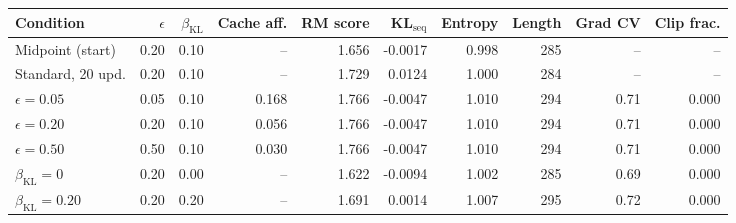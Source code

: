 \begin{tabular}{lrrrrrrrrr}
\toprule
Condition & $\epsilon$ & $\beta_\text{KL}$ & Cache aff. & RM score & KL$_\text{seq}$ & Entropy & Length & Grad CV & Clip frac. \\
\midrule
Midpoint (start) & 0.20 & 0.10 & -- & 1.656 & -0.0017 & 0.998 & 285 & -- & -- \\
Standard, 20 upd. & 0.20 & 0.10 & -- & 1.729 & 0.0124 & 1.000 & 284 & -- & -- \\
\midrule
$\epsilon{=}0.05$ & 0.05 & 0.10 & 0.168 & 1.766 & -0.0047 & 1.010 & 294 & 0.71 & 0.000 \\
$\epsilon{=}0.20$ & 0.20 & 0.10 & 0.056 & 1.766 & -0.0047 & 1.010 & 294 & 0.71 & 0.000 \\
$\epsilon{=}0.50$ & 0.50 & 0.10 & 0.030 & 1.766 & -0.0047 & 1.010 & 294 & 0.71 & 0.000 \\
\midrule
$\beta_\text{KL}{=}0$ & 0.20 & 0.00 & -- & 1.622 & -0.0094 & 1.002 & 285 & 0.69 & 0.000 \\
$\beta_\text{KL}{=}0.20$ & 0.20 & 0.20 & -- & 1.691 & 0.0014 & 1.007 & 295 & 0.72 & 0.000 \\
\bottomrule
\end{tabular}
